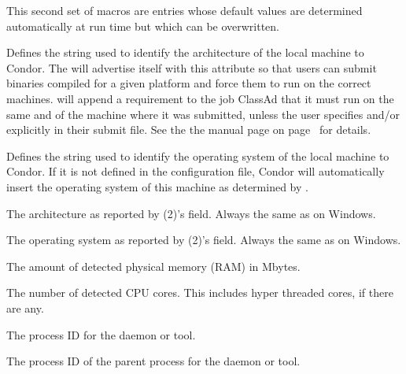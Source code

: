 This second set of macros are entries whose default values are
determined automatically at run time but which can be overwritten.  
\begin{description}

\label{param:Arch}
\item[\MacroU{ARCH}]
  Defines the string
  used to identify the architecture of the local machine to Condor.
  The  will advertise itself with this attribute so
  that users can submit binaries compiled for a given platform and
  force them to run on the correct machines.   will
  append a requirement to the job ClassAd that it must
  run on the same  and  of the machine where
  it was submitted, unless the user specifies  and/or
   explicitly in their submit file.  See the
  the  manual page
  on page~\pageref{man-condor-submit} for details.

\label{param:OpSys}
\item[\MacroU{OPSYS}]
  Defines the string used to identify the operating system
  of the local machine to Condor.
  If it is not defined in the configuration file, Condor will
  automatically insert the operating system of this machine as
  determined by .

\label{param:UnameArch}
\item[\MacroU{UNAME\_ARCH}]
  The architecture as reported by (2)'s  field.
  Always the same as  on Windows.

\label{param:UnameOpsys}
\item[\MacroU{UNAME\_OPSYS}]
  The operating system as reported by (2)'s  field.
  Always the same as  on Windows.

\label{param:DetectedMemory}
\item[\MacroU{DETECTED\_MEMORY}]
  The amount of detected physical memory (RAM) in Mbytes.

\label{param:DetectedCores}
\item[\MacroU{DETECTED\_CORES}]
  The number of detected CPU cores.  
  This includes hyper threaded cores, if there are any.

\label{param:Pid}
\item[\MacroU{PID}]
  The process ID for the daemon or tool.

\label{param:Ppid}
\item[\MacroU{PPID}]
  The process ID of the parent process for the daemon or tool.


\end{description}
